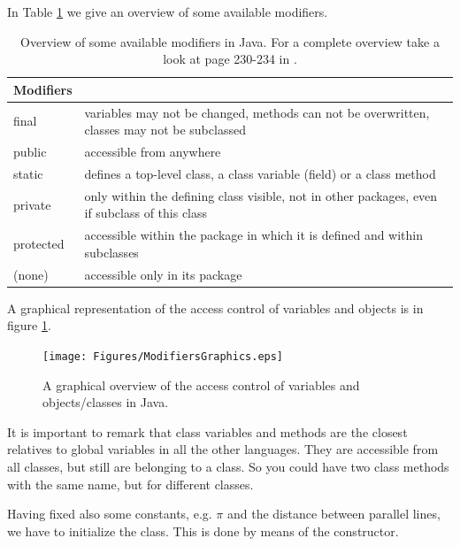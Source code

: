 In Table \ref{tab:modifiers} we give an overview of some available modifiers.
\begin{table}[htbp]
  \begin{center}
    \leavevmode
    \begin{tabular}{l|p{8cm}}
     Modifiers &                                 \\ \hline \hline
     final & variables may not be changed, methods can not be overwritten,
             classes may not be subclassed\\\hline
     public & accessible from anywhere\\ \hline
     static & defines a top-level class, a class variable (field) or 
                 a class method\\\hline
     private & only within the defining class visible, not in other 
               packages, even if subclass of this class\\\hline
     protected & accessible within the package in which it is defined and
                 within subclasses\\\hline
     (none) & accessible only in its package\\
    \end{tabular}
    \caption{Overview of some available modifiers in Java. For a complete
      overview take a look at page 230-234 in \cite{javanutshell}.}
    \label{tab:modifiers}
  \end{center}
\end{table}
A graphical representation of the access control of variables and
objects is in figure \ref{fig:ModifiersGraphics}.
\begin{figure}[htbp]
  \begin{center}
    \texttt{[image: Figures/ModifiersGraphics.eps]}
    \caption{A graphical overview of the access control of variables and objects/classes in Java.}
    \label{fig:ModifiersGraphics}
  \end{center}
\end{figure}

It is important to remark that
class variables and methods are the closest relatives to global 
variables in all the other languages. They are accessible from all
classes, but still are belonging to a class. So you could have two
class methods with the same name, but for different classes.

Having fixed also some constants, e.g. $\pi$ and the distance between
parallel lines, we have to initialize the class. This is done by means
of the constructor.

